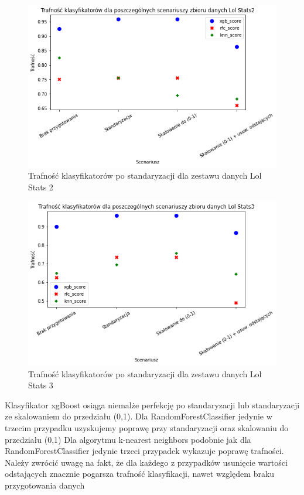 \documentclass{book}
\begin{document}
\begin{figure}[H]
\centerline{\includegraphics[scale=0.5]{Lol_Stats_2_Standaryzacja}}
\centering
\caption{Trafność klasyfikatorów po standaryzacji dla zestawu danych Lol Stats 2}
\end{figure}

\begin{figure}[H]
\centerline{\includegraphics[scale=0.5]{Lol_Stats_3_Standaryzacja}}
\centering
\caption{Trafność klasyfikatorów po standaryzacji dla zestawu danych Lol Stats 3}
\end{figure}

Klasyfikator xgBoost osiąga niemalże perfekcję po 
standaryzacji lub standaryzacji ze skalowaniem do przedziału (0,1). 
Dla RandomForestClassifier jedynie w trzecim przypadku uzyskujemy poprawę przy 
standaryzacji oraz skalowaniu do przedziału (0,1) 
Dla algorytmu k-nearest neighbors podobnie jak dla RandomForestClassifier jedynie 
trzeci przypadek wykazuje poprawę trafności.
Należy zwrócić uwagę na fakt, że dla każdego z przypadków usunięcie wartości 
odstających znacznie pogarsza trafność klasyfikacji, 
nawet względem braku przygotowania danych
\end{document}
